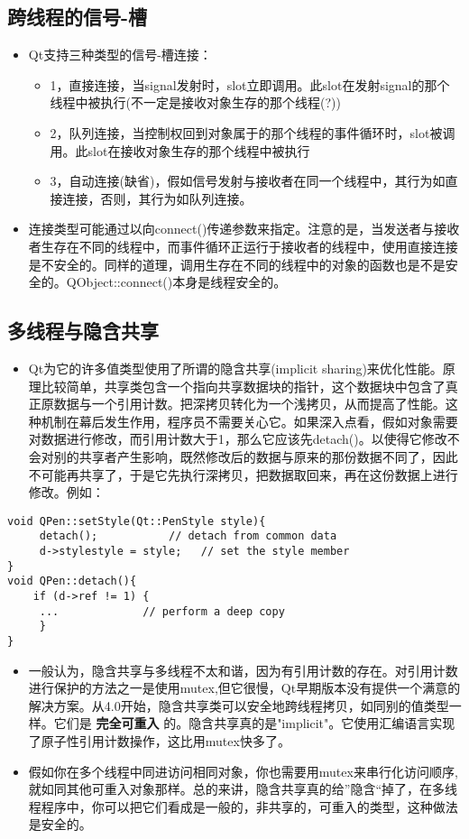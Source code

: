 \documentclass[9pt,b5paper]{article}
\begin{document}
\subsection{跨线程的信号-槽}
\label{sec-2-4}
\begin{itemize}
\item Qt支持三种类型的信号-槽连接：
\begin{itemize}
\item 1，直接连接，当signal发射时，slot立即调用。此slot在发射signal的那个线程中被执行(不一定是接收对象生存的那个线程(?))
\item 2，队列连接，当控制权回到对象属于的那个线程的事件循环时，slot被调用。此slot在接收对象生存的那个线程中被执行
\item 3，自动连接(缺省)，假如信号发射与接收者在同一个线程中，其行为如直接连接，否则，其行为如队列连接。
\end{itemize}
\item 连接类型可能通过以向connect()传递参数来指定。注意的是，当发送者与接收者生存在不同的线程中，而事件循环正运行于接收者的线程中，使用直接连接是不安全的。同样的道理，调用生存在不同的线程中的对象的函数也是不是安全的。QObject::connect()本身是线程安全的。
\end{itemize}
\subsection{多线程与隐含共享}
\label{sec-2-5}
\begin{itemize}
\item Qt为它的许多值类型使用了所谓的隐含共享(implicit sharing)来优化性能。原理比较简单，共享类包含一个指向共享数据块的指针，这个数据块中包含了真正原数据与一个引用计数。把深拷贝转化为一个浅拷贝，从而提高了性能。这种机制在幕后发生作用，程序员不需要关心它。如果深入点看，假如对象需要对数据进行修改，而引用计数大于1，那么它应该先detach()。以使得它修改不会对别的共享者产生影响，既然修改后的数据与原来的那份数据不同了，因此不可能再共享了，于是它先执行深拷贝，把数据取回来，再在这份数据上进行修改。例如：
\end{itemize}

\lstset{language=java,label= ,caption= ,numbers=none}
\begin{lstlisting}
void QPen::setStyle(Qt::PenStyle style){  
     detach();           // detach from common data  
     d->stylestyle = style;   // set the style member  
}  
void QPen::detach(){   
    if (d->ref != 1) {  
	 ...             // perform a deep copy  
     }  
}
\end{lstlisting}
\begin{itemize}
\item 一般认为，隐含共享与多线程不太和谐，因为有引用计数的存在。对引用计数进行保护的方法之一是使用mutex,但它很慢，Qt早期版本没有提供一个满意的解决方案。从4.0开始，隐含共享类可以安全地跨线程拷贝，如同别的值类型一样。它们是 \textbf{完全可重入} 的。隐含共享真的是"implicit"。它使用汇编语言实现了原子性引用计数操作，这比用mutex快多了。
\item 假如你在多个线程中同进访问相同对象，你也需要用mutex来串行化访问顺序,就如同其他可重入对象那样。总的来讲，隐含共享真的给”隐含“掉了，在多线程程序中，你可以把它们看成是一般的，非共享的，可重入的类型，这种做法是安全的。
\end{itemize}
\end{document}
